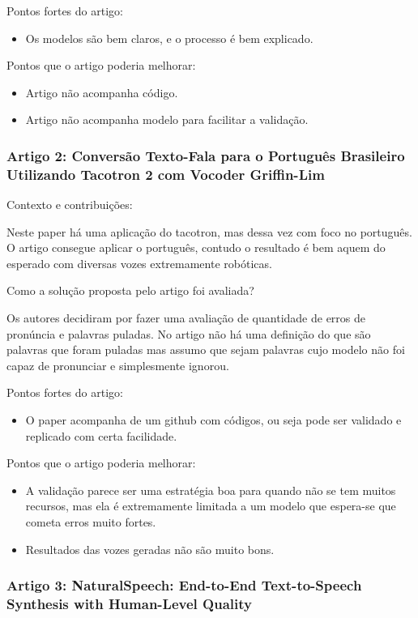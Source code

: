 \documentclass[a4paper,12pt]{article}
\begin{document}
			Pontos fortes do artigo:
			\begin{itemize}
				\item Os modelos são bem claros, e o processo é bem explicado.
			\end{itemize}
			Pontos que o artigo poderia melhorar:
			\begin{itemize}
				\item Artigo não acompanha código.
				\item Artigo não acompanha modelo para facilitar a validação.
			\end{itemize}
			
			
			\subsubsection{Artigo 2: Conversão Texto-Fala para o Português Brasileiro Utilizando Tacotron 2 com Vocoder Griffin-Lim}
			
			Contexto e contribuições:
			
			Neste paper há uma aplicação do tacotron, mas dessa vez com foco no português. O artigo consegue aplicar o português, contudo o resultado é bem aquem do esperado com diversas vozes extremamente robóticas. \cite{rosa2021ttsptbr}

			Como a solução proposta pelo artigo foi avaliada?
			
			Os autores decidiram por fazer uma avaliação de quantidade de erros de pronúncia e palavras puladas. No artigo não há uma definição do que são palavras que foram puladas mas assumo que sejam palavras cujo modelo não foi capaz de pronunciar e simplesmente ignorou.
			
			Pontos fortes do artigo:
			\begin{itemize}
				\item O paper acompanha de um github com códigos, ou seja pode ser validado e replicado com certa facilidade.
			\end{itemize}
			Pontos que o artigo poderia melhorar:
			\begin{itemize}
				\item A validação parece ser uma estratégia boa para quando não se tem muitos recursos, mas ela é extremamente limitada a um modelo que espera-se que cometa erros muito fortes.
				\item Resultados das vozes geradas não são muito bons.
			\end{itemize}
			
			\subsubsection{Artigo 3: NaturalSpeech: End-to-End Text-to-Speech Synthesis with Human-Level Quality}
			
\end{document}
